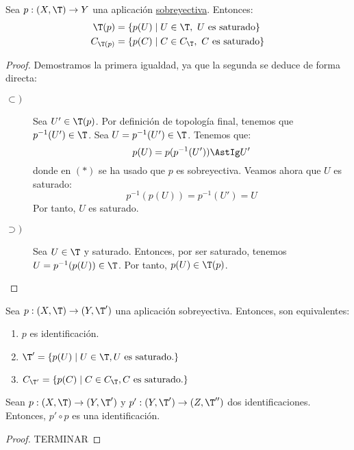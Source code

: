 \begin{prop}
    Sea $p:(X,\T)\to Y$ una aplicación \ul{sobreyectiva}. Entonces:
    \begin{equation}
        \begin{split}
            \T(p) &= \{p(U)\mid U\in \T,~ U\text{ es saturado}\}\\
        C_{\T(p)} &= \{p(C)\mid C\in C_{\T},~ C\text{ es saturado}\}
        \end{split}
    \end{equation}
\end{prop}
\begin{proof}
    Demostramos la primera igualdad, ya que la segunda se deduce de forma directa:
    \begin{description}
        \item[$\subset)$] Sea $U'\in \T(p)$. Por definición de topología final, tenemos que $p^{-1}(U')\in \T$. Sea $U=p^{-1}(U')\in \T$. Tenemos que:
        \begin{equation*}
            p(U)=p(p^{-1}(U'))\AstIg U'
        \end{equation*}
        donde en $(\ast)$ se ha usado que $p$ es sobreyectiva. Veamos ahora que $U$ es saturado:
        \begin{equation*}
            p^{-1}(p(U)) = p^{-1}(U') = U
        \end{equation*}
        Por tanto, $U$ es saturado.

        \item[$\supset)$] Sea $U\in \T$ y saturado. Entonces, por ser saturado, tenemos $U=p^{-1}(p(U))\in \T$. Por tanto, $p(U)\in \T(p)$.
    \end{description}
\end{proof}



\begin{coro}
    Sea $p:(X,\T)\to (Y,\T')$ una aplicación sobreyectiva. Entonces, son equivalentes:
    \begin{enumerate}
        \item $p$ es identificación.
        \item $\T' = \{p(U)\mid U\in \T, U \text{ es saturado.}\}$
        \item $C_{\T'}= \{p(C)\mid C\in C_{\T}, C \text{ es saturado.}\}$
    \end{enumerate}
\end{coro}


\begin{prop}
    Sean $p:(X,\T)\to (Y,\T')$ y $p':(Y,\T')\to (Z,\T'')$ dos identificaciones. Entonces, $p'\circ p$ es una identificación.
\end{prop}
\begin{proof}
    TERMINAR
\end{proof}

